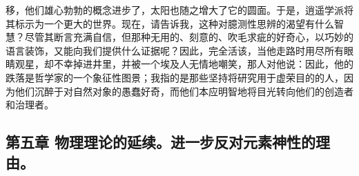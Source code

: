 移，他们雄心勃勃的概念进步了，太阳也随之增大了它的圆面。于是，逍遥学派将其标示为一个更大的世界。现在，请告诉我，这种对臆测性思辨的渴望有什么智慧？尽管其断言充满自信，但那种无用的、刻意的、吹毛求疵的好奇心，以巧妙的语言装饰，又能向我们提供什么证据呢？因此，完全活该，当他走路时用尽所有眼睛观星，却不幸掉进井里，并被一个埃及人无情地嘲笑，那人对他说：因此，他的跌落是哲学家的一个象征性图景；我指的是那些坚持将研究用于虚荣目的的人，因为他们沉醉于对自然对象的愚蠢好奇，而他们本应明智地将目光转向他们的创造者和治理者。\par


\subsection{第五章 物理理论的延续。进一步反对元素神性的理由。}


